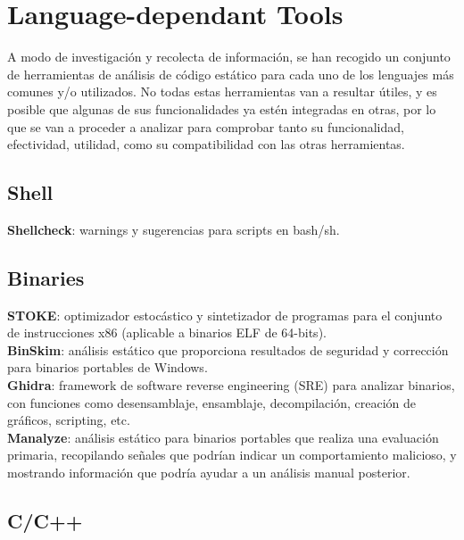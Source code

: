 \section{Language-dependant Tools}

A modo de investigación y recolecta de información, se han recogido un conjunto de herramientas de análisis de código estático para cada uno de los lenguajes más comunes y/o utilizados. No todas estas herramientas van a resultar útiles, y es posible que algunas de sus funcionalidades ya estén integradas en otras, por lo que se van a proceder a analizar para comprobar tanto su funcionalidad, efectividad, utilidad, como su compatibilidad con las otras herramientas.

\subsection{Shell}

\textbf{Shellcheck}: warnings y sugerencias para scripts en bash/sh.

\subsection{Binaries}

\textbf{STOKE}: optimizador estocástico y sintetizador de programas para el conjunto de instrucciones x86 (aplicable a binarios ELF de 64-bits).\\
\textbf{BinSkim}: análisis estático que proporciona resultados de seguridad y corrección para binarios portables de Windows.\\
\textbf{Ghidra}: framework de software reverse engineering (SRE) para analizar binarios, con funciones como desensamblaje, ensamblaje, decompilación, creación de gráficos, scripting, etc.\\
\textbf{Manalyze}: análisis estático para binarios portables que realiza una evaluación primaria, recopilando señales que podrían indicar un comportamiento malicioso, y mostrando información que podría ayudar a un análisis manual posterior.

\subsection{C/C++}


